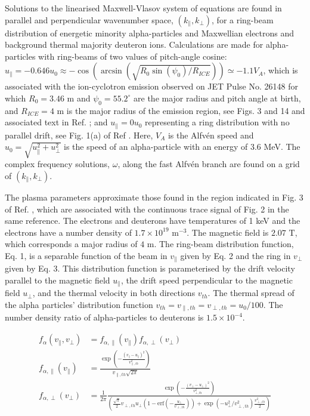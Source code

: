 \documentclass[12pt]{iopart}
\begin{document}
Solutions to the linearised Maxwell-Vlasov system of equations are found in
parallel and perpendicular wavenumber space, $(k_\parallel, k_\bot)$, for a
ring-beam distribution of energetic minority
alpha-particles and Maxwellian electrons and background thermal majority
deuteron ions. Calculations are made for alpha-particles with ring-beams of two
values of pitch-angle cosine: $u_\parallel=-0.646 u_0 \approx
-\cos(\arcsin(\sqrt{R_0 \sin(\psi_0)/R_{ICE}})) \simeq -1.1 V_A$, which is
associated with the ion-cyclotron emission observed on JET Pulse No. 26148 for
which $R_0=3.46$ m and
$\psi_0=55.2^\circ$ are the major radius and pitch angle at birth, and
$R_{ICE}=4$ m is the major radius of the emission region, see
Figs. 3 and 14 and associated text in Ref. \cite{Cottrell1993}; and
$u_\parallel=0 u_0$ representing a ring distribution with no parallel drift, see
Fig. 1(a) of Ref \cite{Cook2013}. Here, $V_A$ is the Alfv{\'en} speed and $u_0=\sqrt{u_\parallel^2 + u_\perp^2}$ is
the speed of an alpha-particle with an energy of 3.6 MeV. The complex frequency
solutions, $\omega$, along the fast Alfv{\'e}n branch are found on a grid of $(k_\parallel, k_\bot)$.

The plasma parameters approximate those found in the region indicated in Fig. 3
of Ref. \cite{Cottrell1993}, which are associated with the continuous trace
signal of Fig. 2 in the same reference. The electrons and deuterons have
temperatures of 1 keV and the electrons have a number density
of $1.7\times 10^{19}$ $\mathrm{m^{-3}}$. The magnetic field is $2.07$
$\mathrm{T}$, which corresponds a major radius of $4$ m.
The ring-beam distribution function, Eq. 1, is a separable
function of the beam in $v_\parallel$ given by Eq. 2 and the
ring in $v_\perp$ given by Eq. 3.
This distribution function is parameterised by the drift
velocity parallel to the magnetic field $u_\parallel$, the drift speed 
perpendicular to the magnetic
field $u_{\perp}$, and the thermal velocity in both directions $v_{th}$. The
thermal spread of the alpha particles' distribution function 
$v_{th}=v_{\parallel,th}=v_{\perp,th}=u_0/100$. The number density
ratio of alpha-particles to deuterons is $1.5\times10^{-4}$.

\begin{align}
f_\alpha\left(v_\parallel, v_\perp\right) &=
  f_{\alpha,\parallel}\left(v_\parallel\right)f_{\alpha,\perp}\left(v_\perp\right)\\
f_{\alpha,\parallel}\left(v_\parallel\right) &=
  \frac{\exp\left(-\frac{(v_\parallel -
  u_\parallel)^2}{v_{\parallel,th}^2}\right)}{v_{\parallel,th} \sqrt{2
  \pi}}\\
f_{\alpha,\perp}\left(v_\perp\right) &=
  \frac{1}{2\pi}\frac{\exp\left(-\frac{\left(v_\bot -
  u_\bot\right)^2}{v_{\bot,th}^2}\right)}{\left(\frac{\sqrt \pi}{2} v_{\perp,
  th} u_\bot (1 - \mathrm{erf}(-\frac{u_\bot}{v_{\perp,th}})) + \exp(-u_\bot^2 /
  v_{\perp, th}^2) \frac{v_{\perp,th}^2}{2}\right)}\\
\end{align}
\end{document}
